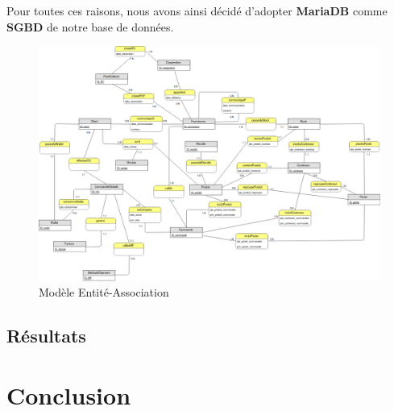 \documentclass[a4paper,12pt]{report}
\theoremstyle{break}
\theoremstyle{break}
\theoremstyle{break}
\theoremstyle{break}
\theoremstyle{definition}
\theoremstyle{remark}
\begin{document}
Pour toutes ces raisons, nous avons ainsi décidé d'adopter \textbf{MariaDB} comme \textbf{SGBD} de notre base de données.

\begin{figure}[!ht]
  \centering
  \includegraphics[scale=0.35]{images/er_model.png}
  \caption{Modèle Entité-Association}
  \label{fig:modele_EA}
\end{figure}

\newpage
\section{Résultats}
\chapter{Conclusion}
\end{document}
